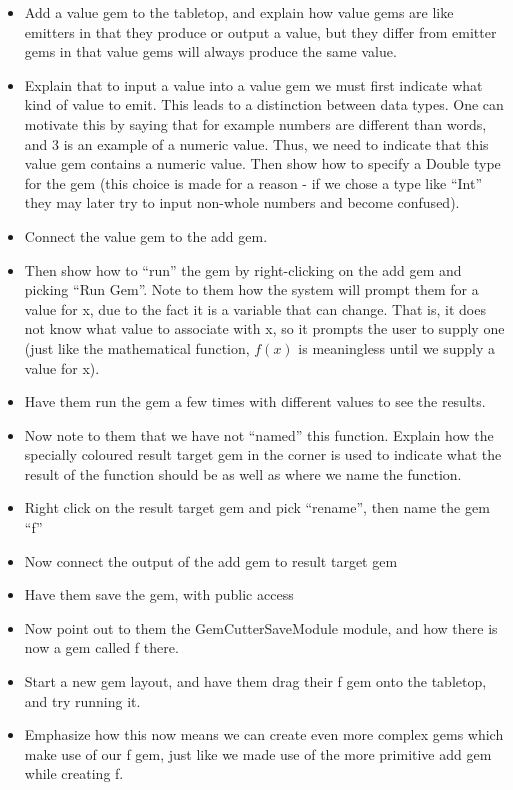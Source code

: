 {\begin{itemize}
			\item Add a value gem to the tabletop, and explain how value gems are like emitters in that they produce or output a value, but they differ from emitter gems in that value gems will always produce the same value.
			\item Explain that to input a value into a value gem we must first indicate what kind of value to emit.  This leads to a distinction between data types.  One can motivate this by saying that for example numbers are different than words, and 3 is an example of a numeric value.  Thus, we need to indicate that this value gem contains a numeric value.  Then show how to specify a Double type for the gem (this choice is made for a reason - if we chose a type like ``Int'' they may later try to input non-whole numbers and become confused).
			\item Connect the value gem to the add gem.
			\item Then show how to ``run'' the gem by right-clicking on the add gem and picking ``Run Gem''.  Note to them how the system will prompt them for a value for x, due to the fact it is a variable that can change.  That is, it does not know what value to associate with x, so it prompts the user to supply one (just like the mathematical function, \(f(x)\) is meaningless until we supply a value for x).
			\item Have them run the gem a few times with different values to see the results.
			\item Now note to them that we have not ``named'' this function.  Explain how the specially coloured result target gem in the corner is used to indicate what the result of the function should be as well as where we name the function.
			\item Right click on the result target gem and pick ``rename'', then name the gem ``f''
			\item Now connect the output of the add gem to result target gem
			\item Have them save the gem, with public access
			\item Now point out to them the GemCutterSaveModule module, and how there is now a gem called f there.
			\item Start a new gem layout, and have them drag their f gem onto the tabletop, and try running it.
			\item Emphasize how this now means we can create even more complex gems which make use of our f gem, just like we made use of the more primitive add gem while creating f.
		\end{itemize}
	}